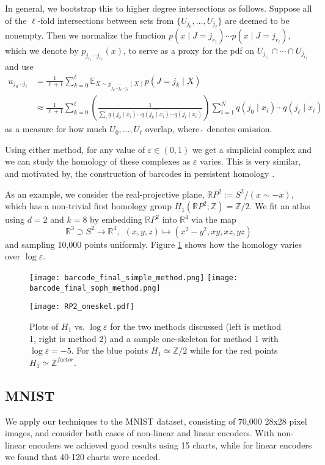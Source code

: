 \documentclass[reqno,11pt]{article}
\newcommand{\eps}{\varepsilon}
\newcommand{\R}{\mathbb{R}}
\newcommand{\E}{\mathbb E}
\begin{document}
In general, we bootstrap this to higher degree intersections as follows. Suppose all of the $\ell$-fold intersections between sets from $\{U_{j_0}, \ldots, U_{j_\ell}\}$ are deemed to be nonempty.  Then we normalize the function $p(x \mid J=j_{r_1}) \cdots p(x \mid J = j_{r_\ell})$, which we denote by $p_{j_{r_1}\cdots j_{r_\ell}}(x)$, to serve as a proxy for the pdf on $U_{j_{r_1}} \cap \cdots \cap U_{j_{r_\ell}}$ and use
\begin{align*}
u_{j_0\cdots j_\ell} &= \frac{1}{\ell+1} \sum_{k=0}^\ell \E_{X \sim p_{j_0\cdots \widehat{j_k} \cdots j_{\ell}}(X)} p(J = j_k \mid X) \\
&\approx \frac{1}{\ell + 1} \sum_{k=0}^\ell \left( \frac{1}{\sum_i q(j_0 \mid x_i) \cdots \widehat{q(j_k \mid x_i)} \cdots q(j_\ell \mid x_i) }\right)  \sum_{i=1}^N q(j_0 \mid x_i) \cdots q(j_\ell \mid x_i)
\end{align*}
as a measure for how much $U_0, \ldots, U_\ell$ overlap, where $\hat{~}$ denotes omission.

Using either method, for any value of $\eps \in (0,1)$ we get a simplicial complex and we can study the homology of these complexes as $\eps$ varies. This is very similar, and motivated by, the construction of barcodes in persistent homology \cite{TDA}. 

As an example, we consider the real-projective plane, $\R P^2 := S^2 / (x \sim -x)$, which has a non-trivial first homology group $H_1(\R P^2; \mathbb Z) = \mathbb Z/2$. We fit an atlas using $d=2$ and $k=8$ by embedding $\R P^2$ into $\R^4$ via the map
\[
\R^3 \supset S^2 \to \R^4, ~~ (x,y,z) \mapsto (x^2 - y^2, xy, xz, yz)
\]
and sampling 10,000 points uniformly.  Figure \ref{RP2-oneskel} shows how the homology varies over $\log \eps$.

\begin{figure}
\centering
\captionsetup{width=.85\linewidth}
\texttt{[image: barcode\_final\_simple\_method.png]} \texttt{[image: barcode\_final\_soph\_method.png]}

\texttt{[image: RP2\_oneskel.pdf]}
\caption{Plots of $H_1$ vs. $\log\eps$ for the two methods discussed (left is method 1, right is method 2) and a sample one-skeleton for method 1 with $\log \eps = -5$. For the blue points $H_1 \simeq \mathbb Z/2$ while for the red points $H_1 \simeq \mathbb Z^{factor}$.}
\label{RP2-oneskel}
\end{figure}

\pagebreak

\subsection{MNIST}
We apply our techniques to the MNIST dataset, consisting of 70,000 28x28 pixel images, and consider both cases of non-linear and linear encoders. With non-linear encoders we achieved good results using 15 charts, while for linear encoders we found that 40-120 charts were needed.
\end{document}
